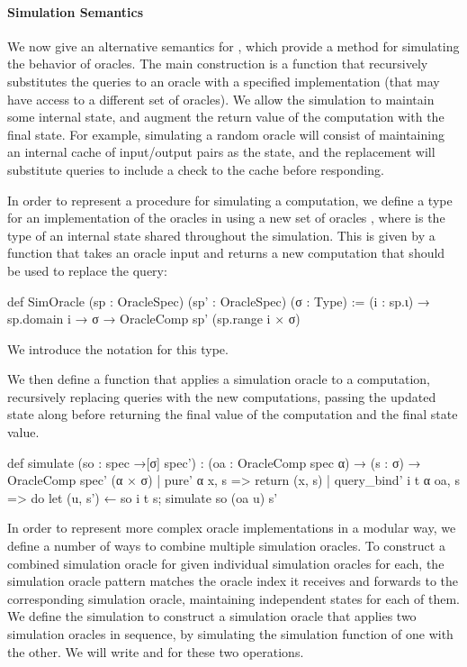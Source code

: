 \paragraph{Simulation Semantics} 
We now give an alternative semantics for , which provide a method for simulating the behavior of oracles.
The main construction is a function  that recursively substitutes the queries to an oracle with a specified implementation (that may have access to a different set of oracles).
We allow the simulation to maintain some internal state, and augment the return value of the computation with the final state.
For example, simulating a random oracle will consist of maintaining an internal cache of input/output pairs as the state, and the replacement will substitute queries to include a check to the cache before responding.

In order to represent a procedure for simulating a computation, we define a type     for an implementation of the oracles in  using a new set of oracles , where  is the type of an internal state shared throughout the simulation.
This is given by a function that takes an oracle input and returns a new computation that should be used to replace the query:
\begin{leancode}
  def SimOracle (sp : OracleSpec) (sp' : OracleSpec) (σ : Type) :=
    (i : sp.ι) → sp.domain i → σ → OracleComp sp' (sp.range i × σ)
\end{leancode}
We introduce the notation  for this type.

We then define a function  that applies a simulation oracle to a computation, recursively replacing queries with the new computations, passing the updated state along before returning the final value of the computation and the final state value.
\begin{leancode}
  def simulate (so : spec →[σ] spec') :
      (oa : OracleComp spec α) → (s : σ) → OracleComp spec' (α × σ)
    | pure' α x, s => return (x, s)
    | query_bind' i t α oa, s => do let (u, s') ← so i t s;
        simulate so (oa u) s'
\end{leancode}

In order to represent more complex oracle implementations in a modular way, we define a number of ways to combine multiple simulation oracles.
To construct a combined simulation oracle for 
given individual simulation oracles for each, the simulation oracle pattern matches the oracle index it receives and forwards to the corresponding simulation oracle, maintaining independent states for each of them.
We define the  simulation to construct a simulation oracle that applies two simulation oracles in sequence, by simulating the simulation function of one with the other.  We will write \lean{++} and  for these two operations.


